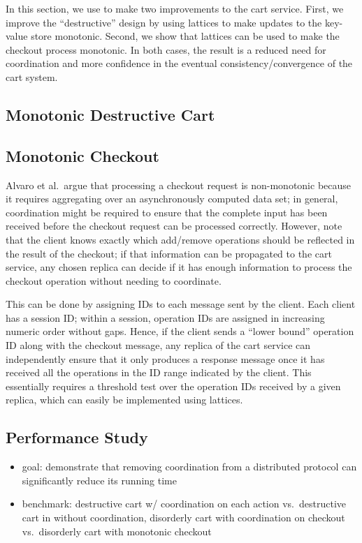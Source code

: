 In this section, we use \lang to make two improvements to the cart
service. First, we improve the ``destructive'' design by using lattices to make
updates to the key-value store monotonic. Second, we show that lattices can be
used to make the checkout process monotonic. In both cases, the result is a
reduced need for coordination and more confidence in the eventual
consistency/convergence of the cart system.

\subsection{Monotonic Destructive Cart}

\subsection{Monotonic Checkout}
Alvaro et al.\ argue that processing a checkout request is non-monotonic because
it requires aggregating over an asynchronously computed data set; in general,
coordination might be required to ensure that the complete input has been
received before the checkout request can be processed correctly. However, note
that the client knows exactly which add/remove operations should be reflected in
the result of the checkout; if that information can be propagated to the cart
service, any chosen replica can decide if it has enough information to process
the checkout operation without needing to coordinate.

This can be done by assigning IDs to each message sent by the client. Each
client has a session ID; within a session, operation IDs are assigned in
increasing numeric order without gaps. Hence, if the client sends a ``lower
bound'' operation ID along with the checkout message, any replica of the cart
service can independently ensure that it only produces a response message once
it has received all the operations in the ID range indicated by the client. This
essentially requires a threshold test over the operation IDs received by a given
replica, which can easily be implemented using lattices.

\subsection{Performance Study}
\begin{itemize}
\item
  goal: demonstrate that removing coordination from a distributed protocol can
  significantly reduce its running time
\item
  benchmark: destructive cart w/ coordination on each action vs.\ destructive
  cart in \lang without coordination, disorderly cart with coordination on
  checkout vs.\ disorderly cart with monotonic checkout
\end{itemize}
